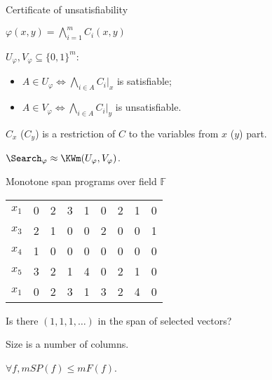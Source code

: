 \begin{frame}{Certificate of unsatisfiability}

    $\varphi(x, y) = \bigwedge\limits_{i = 1}^{m} C_i(x, y)$

    \vspace{0.5cm}

    $U_{\varphi}, V_{\varphi} \subseteq \{0, 1\}^m$:
    \begin{itemize}
        \item $A \in U_{\varphi} \Leftrightarrow \bigwedge\limits_{i \in A} C_i|_{x}$ is satisfiable;
        \item $A \in V_{\varphi} \Leftrightarrow \bigwedge\limits_{i \in A} C_i|_{y}$ is unsatisfiable.
    \end{itemize}

    $C_{x}$ ($C_{y}$) is a restriction of $C$ to the variables from $x$ ($y$) part.

    \begin{lemma}
        $\Search_{\varphi} \approx \KWm(U_{\varphi}, V_{\varphi})$.
    \end{lemma}
\end{frame}


\begin{frame}{Monotone span programs over field $\mathbb{F}$}

    \begin{tabular}{c|cccccccc}
        & & & & & & & &\\
        \hline
        $x_1$ & 0 & 2 & 3 & 1 & 0 & 2 & 1 & 0\\
        $x_3$ & 2 & 1 & 0 & 0 & 2 & 0 & 0 & 1\\
        $x_4$ & 1 & 0 & 0 & 0 & 0 & 0 & 0 & 0\\
        $x_5$ & 3 & 2 & 1 & 4 & 0 & 2 & 1 & 0\\
        $x_1$ & 0 & 2 & 3 & 1 & 3 & 2 & 4 & 0\\
    \end{tabular}

    \vspace{0.3cm}
    
	Is there $(1, 1, 1, \dots)$ in the span of selected vectors?

    \vspace{0.3cm}

	Size is a number of columns.
    
    \begin{lemma}[Pudl{\'{a}}k ??]
        $\forall f, mSP(f) \le mF(f)$.
    \end{lemma}

\end{frame}

